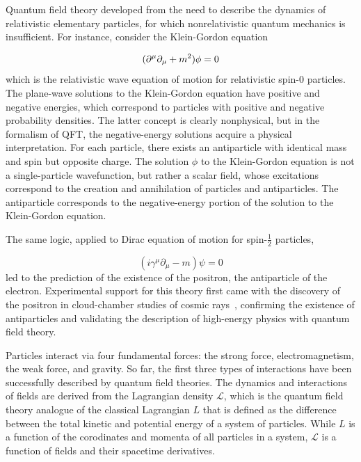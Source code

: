 Quantum field theory developed from the need to describe the dynamics of relativistic elementary particles, for which nonrelativistic quantum mechanics is insufficient. For instance, consider the Klein-Gordon equation

\begin{equation}
(\partial^{\mu}\partial_{\mu} + m^{2})\phi = 0\newline
\label{eq:KG}
\end{equation}
which is the relativistic wave equation of motion for relativistic spin-0 particles. The plane-wave solutions to the Klein-Gordon equation have positive and negative energies, which correspond to particles with positive and negative probability densities. The latter concept is clearly nonphysical, but in the formalism of QFT, the negative-energy solutions acquire a physical interpretation\cite{PeskinSchroederPhysics,ThomsonPhysics}. For each particle, there exists an antiparticle with identical mass and spin but opposite charge. The solution $\phi$ to the Klein-Gordon equation is not a single-particle wavefunction, but rather a scalar field, whose excitations correspond to the creation and annihilation of particles and antiparticles. The antiparticle corresponds to the negative-energy portion of the solution to the Klein-Gordon equation.

The same logic, applied to Dirac equation of motion for spin-$\frac{1}{2}$ particles,

\begin{equation}
(i\gamma^{\mu}\partial_{\mu} - m)\psi = 0
\label{eq:Dirac}
\end{equation}
led to the prediction of the existence of the positron, the antiparticle of the electron. Experimental support for this theory first came with the discovery of the positron in cloud-chamber studies of cosmic rays~\cite{BettiniPhysics}, confirming the existence of antiparticles and validating the description of high-energy physics with quantum field theory.

Particles interact via four fundamental forces: the strong force, electromagnetism, the weak force, and gravity. So far, the first three types of interactions have been successfully described by quantum field theories. The dynamics and interactions of fields are derived from the Lagrangian density $\mathcal{L}$, which is the quantum field theory analogue of the classical Lagrangian $L$ that is defined as the difference between the total kinetic and potential energy of a system of particles. While $L$ is a function of the corodinates and momenta of all particles in a system, $\mathcal{L}$ is a function of fields and their spacetime derivatives.

